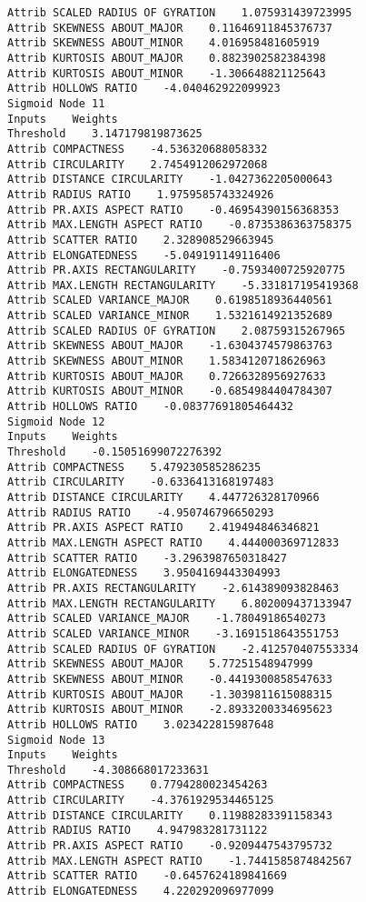 \documentclass[
	article,			%
	11pt,				%
	oneside,			%
	a4paper,			%
	english,			%
	brazil,				%
	sumario=tradicional
	]{abntex2}
\begin{document}
\begin{lstlisting}
Attrib SCALED RADIUS OF GYRATION    1.075931439723995
Attrib SKEWNESS ABOUT_MAJOR    0.11646911845376737
Attrib SKEWNESS ABOUT_MINOR    4.016958481605919
Attrib KURTOSIS ABOUT_MAJOR    0.8823902582384398
Attrib KURTOSIS ABOUT_MINOR    -1.306648821125643
Attrib HOLLOWS RATIO    -4.040462922099923
Sigmoid Node 11
Inputs    Weights
Threshold    3.147179819873625
Attrib COMPACTNESS    -4.536320688058332
Attrib CIRCULARITY    2.7454912062972068
Attrib DISTANCE CIRCULARITY    -1.0427362205000643
Attrib RADIUS RATIO    1.9759585743324926
Attrib PR.AXIS ASPECT RATIO    -0.46954390156368353
Attrib MAX.LENGTH ASPECT RATIO    -0.8735386363758375
Attrib SCATTER RATIO    2.328908529663945
Attrib ELONGATEDNESS    -5.049191149116406
Attrib PR.AXIS RECTANGULARITY    -0.7593400725920775
Attrib MAX.LENGTH RECTANGULARITY    -5.331817195419368
Attrib SCALED VARIANCE_MAJOR    0.6198518936440561
Attrib SCALED VARIANCE_MINOR    1.5321614921352689
Attrib SCALED RADIUS OF GYRATION    2.08759315267965
Attrib SKEWNESS ABOUT_MAJOR    -1.6304374579863763
Attrib SKEWNESS ABOUT_MINOR    1.5834120718626963
Attrib KURTOSIS ABOUT_MAJOR    0.7266328956927633
Attrib KURTOSIS ABOUT_MINOR    -0.6854984404784307
Attrib HOLLOWS RATIO    -0.08377691805464432
Sigmoid Node 12
Inputs    Weights
Threshold    -0.15051699072276392
Attrib COMPACTNESS    5.479230585286235
Attrib CIRCULARITY    -0.6336413168197483
Attrib DISTANCE CIRCULARITY    4.447726328170966
Attrib RADIUS RATIO    -4.950746796650293
Attrib PR.AXIS ASPECT RATIO    2.419494846346821
Attrib MAX.LENGTH ASPECT RATIO    4.444000369712833
Attrib SCATTER RATIO    -3.2963987650318427
Attrib ELONGATEDNESS    3.9504169443304993
Attrib PR.AXIS RECTANGULARITY    -2.614389093828463
Attrib MAX.LENGTH RECTANGULARITY    6.802009437133947
Attrib SCALED VARIANCE_MAJOR    -1.78049186540273
Attrib SCALED VARIANCE_MINOR    -3.1691518643551753
Attrib SCALED RADIUS OF GYRATION    -2.412570407553334
Attrib SKEWNESS ABOUT_MAJOR    5.77251548947999
Attrib SKEWNESS ABOUT_MINOR    -0.4419300858547633
Attrib KURTOSIS ABOUT_MAJOR    -1.3039811615088315
Attrib KURTOSIS ABOUT_MINOR    -2.8933200334695623
Attrib HOLLOWS RATIO    3.023422815987648
Sigmoid Node 13
Inputs    Weights
Threshold    -4.308668017233631
Attrib COMPACTNESS    0.7794280023454263
Attrib CIRCULARITY    -4.3761929534465125
Attrib DISTANCE CIRCULARITY    0.11988283391158343
Attrib RADIUS RATIO    4.947983281731122
Attrib PR.AXIS ASPECT RATIO    -0.9209447543795732
Attrib MAX.LENGTH ASPECT RATIO    -1.7441585874842567
Attrib SCATTER RATIO    -0.6457624189841669
Attrib ELONGATEDNESS    4.220292096977099

\end{lstlisting}
\end{document}
